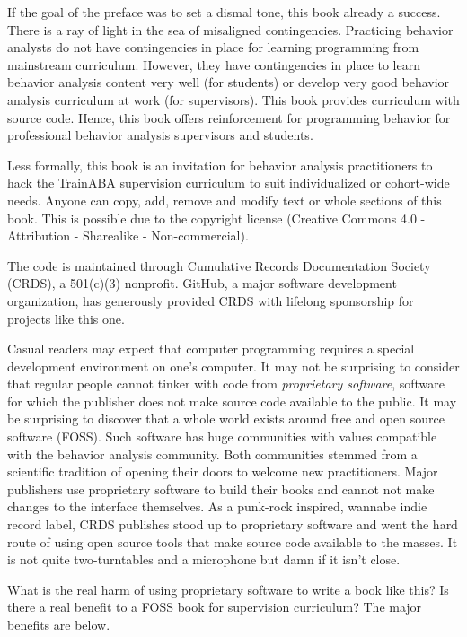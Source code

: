 If the goal of the preface was to set a dismal tone, this book already a success. There is a ray of light in the sea of misaligned contingencies. Practicing behavior analysts do not have contingencies in place for learning programming from mainstream curriculum. However, they have contingencies in place to learn behavior analysis content very well (for students) or develop very good behavior analysis curriculum at work (for supervisors). This book provides curriculum with source code. Hence, this book offers reinforcement for programming behavior for professional behavior analysis supervisors and students. 

Less formally, this book is an invitation for behavior analysis practitioners to hack the TrainABA supervision curriculum to suit individualized or cohort-wide needs. Anyone can copy, add, remove and modify text or whole sections of this book. This is possible due to the copyright license (Creative Commons 4.0 - Attribution - Sharealike - Non-commercial).

The code is maintained through Cumulative Records Documentation Society (CRDS), a 501(c)(3) nonprofit. GitHub, a major software development organization, has generously provided CRDS with lifelong sponsorship for projects like this one.

Casual readers may expect that computer programming requires a  special development environment on one's computer. It may not be surprising to consider that regular people cannot tinker with code from \textit{proprietary software}, software for which the publisher does not make source code available to the public. It may be surprising to discover that a whole world exists around free and open source software (FOSS). Such software has huge communities with values compatible with the behavior analysis community. Both communities stemmed from a scientific tradition of opening their doors to welcome new practitioners. Major publishers use proprietary software to build their books and cannot not make changes to the interface themselves. As a punk-rock inspired, wannabe indie record label, CRDS publishes stood up to proprietary software and went the hard route of using open source tools that make source code available to the masses. It is not quite two-turntables and a microphone but damn if it isn't close.

What is the real harm of using proprietary software to write a book like this? Is there a real benefit to a FOSS book for supervision curriculum? The major benefits are below.

